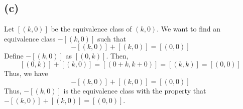 \documentclass{article}
\begin{document}
\subsection*{(c)}
Let \([(k, 0)]\) be the equivalence class of \((k, 0)\). We want to find an equivalence class \(-[(k, 0)]\) such that
\[
   -[(k, 0)] + [(k, 0)] = [(0, 0)]
\]
Define \(-[(k, 0)]\) as \([(0, k)]\). Then,
\[
   [(0, k)] + [(k, 0)] = [(0 + k, k + 0)] = [(k, k)] = [(0, 0)]
\]
Thus, we have
\[
   -[(k, 0)] + [(k, 0)] = [(0, 0)]
\]
Thus, \(-[(k, 0)]\) is the equivalence class with the property that
\(-[(k, 0)] + [(k, 0)] = [(0, 0)]\).
\end{document}
